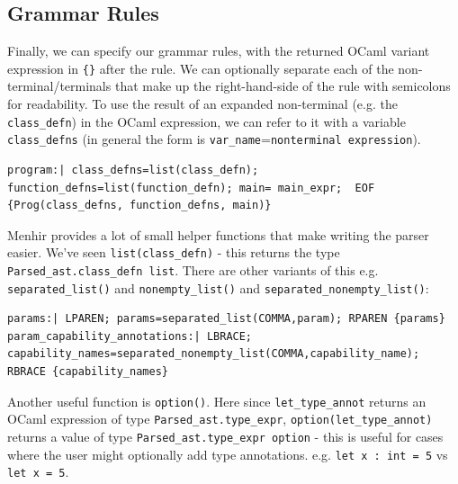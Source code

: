 \hypertarget{grammar-rules}{%
\subsection{\texorpdfstring{\protect\hyperlink{grammar-rules}{}Grammar
Rules}{Grammar Rules}}\label{grammar-rules}}

Finally, we can specify our grammar rules, with the returned OCaml
variant expression in \texttt{\{\}} after the rule. We can optionally
separate each of the non-terminal/terminals that make up the
right-hand-side of the rule with semicolons for readability. To use the
result of an expanded non-terminal (e.g. the \texttt{class\_defn}) in
the OCaml expression, we can refer to it with a variable
\texttt{class\_defns} (in general the form is
\texttt{var\_name}=\texttt{nonterminal\ expression}).

%

\begin{lstlisting}[caption={parser.mly}]
program:| class_defns=list(class_defn); function_defns=list(function_defn); main= main_expr;  EOF {Prog(class_defns, function_defns, main)}
\end{lstlisting}

Menhir provides a lot of small helper functions that make writing the
parser easier. We've seen \texttt{list(class\_defn)} - this returns the
type \texttt{Parsed\_ast.class\_defn\ list}. There are other variants of
this e.g. \texttt{separated\_list()} and \texttt{nonempty\_list()} and
\texttt{separated\_nonempty\_list()}:

%

\begin{lstlisting}[caption={parser.mly}]
params:| LPAREN; params=separated_list(COMMA,param); RPAREN {params}
param_capability_annotations:| LBRACE;  capability_names=separated_nonempty_list(COMMA,capability_name); RBRACE {capability_names}
\end{lstlisting}

Another useful function is \texttt{option()}. Here since
\texttt{let\_type\_annot} returns an OCaml expression of type
\texttt{Parsed\_ast.type\_expr}, \texttt{option(let\_type\_annot)}
returns a value of type \texttt{Parsed\_ast.type\_expr\ option} - this
is useful for cases where the user might optionally add type
annotations. e.g. \texttt{let\ x\ :\ int\ =\ 5} vs
\texttt{let\ x\ =\ 5}.

